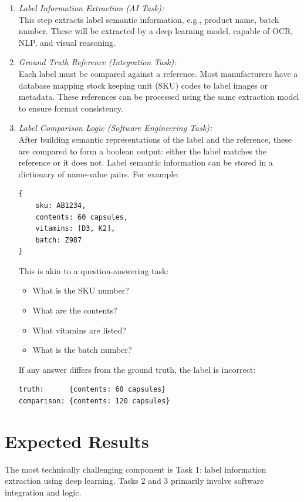 \documentclass[conference]{IEEEtran}
\begin{document}
\begin{enumerate}
    \item \textit{Label Information Extraction (AI Task):}\\
    This step extracts label semantic information, e.g., product name, batch number. These will be extracted by a deep learning model, capable of OCR, NLP, and visual reasoning.
    \item \textit{Ground Truth Reference (Integration Task):}\\
    Each label must be compared against a reference. Most manufacturers have a database mapping stock keeping unit (SKU) codes to label images or metadata. These references can be processed using the same extraction model to ensure format consistency.
    \item \textit{Label Comparison Logic (Software Engineering Task):}\\
    After building semantic representations of the label and the reference, these are compared to form a boolean output: either the label matches the reference or it does not. Label semantic information can be stored in a dictionary of name-value pairs. For example:

\begin{verbatim}
{
    sku: AB1234, 
    contents: 60 capsules, 
    vitamins: [D3, K2], 
    batch: Z987
}
\end{verbatim}

This is akin to a question-answering task:

\begin{itemize}
  \item What is the SKU number?
  \item What are the contents?
  \item What vitamins are listed?
  \item What is the batch number?
\end{itemize}

If any answer differs from the ground truth, the label is incorrect:
\begin{verbatim}
truth:      {contents: 60 capsules}
comparison: {contents: 120 capsules}
\end{verbatim}
\end{enumerate}

\section{Expected Results}
The most technically challenging component is Task 1: label information extraction using deep learning. Tasks 2 and 3 primarily involve software integration and logic.
\end{document}
